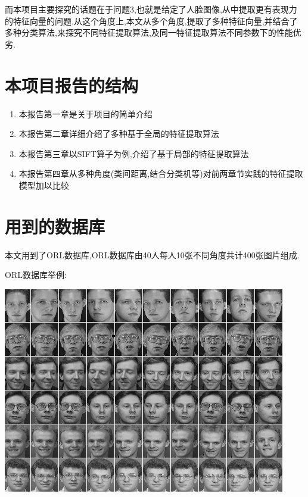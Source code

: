 而本项目主要探究的话题在于问题3,也就是给定了人脸图像,从中提取更有表现力的特征向量的问题.从这个角度上,本文从多个角度,提取了多种特征向量,并结合了多种分类算法,来探究不同特征提取算法,及同一特征提取算法不同参数下的性能优劣.
\section{本项目报告的结构}
\begin{enumerate}
	\item 本报告第一章是关于项目的简单介绍
	\item 本报告第二章详细介绍了多种基于全局的特征提取算法
	\item 本报告第三章以SIFT算子为例,介绍了基于局部的特征提取算法
	\item 本报告第四章从多种角度(类间距离,结合分类机等)对前两章节实践的特征提取模型加以比较
\end{enumerate}
\section{用到的数据库}
本文用到了ORL数据库\cite{samaria1994parameterisation},ORL数据库由40人每人10张不同角度共计400张图片组成.

ORL数据库举例:
	
	\begin{center}
	\begin{minipage}[t]{\linewidth}
	\center
	{
	\includegraphics[width=\textwidth]{Img/faces} 
	}
	\end{minipage}
	\medskip
	\end{center}
		

